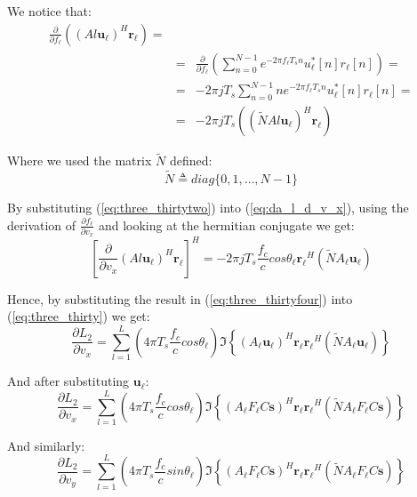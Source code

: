 We notice that:
\begin{eqnarray}
\label{eq:three_thirtytwo}
\frac{\partial}{\partial f_\ell}\left( (Al \mathbf{u_\ell})^H \mathbf{r_\ell}\right) = \\
&=& \frac{\partial}{\partial f_\ell} \left(
\sum_{n=0}^{N-1}e^{-2 \pi f_\ell T_s n}u_\ell^*[n]r_\ell[n]
\right) = \nonumber\\
&=& -2 \pi j T_s \sum_{n=0}^{N-1}ne^{-2 \pi f_\ell T_s n}u_\ell^*[n]r_\ell[n] = 
\nonumber\\
&=& -2 \pi j T_s \left( (\tilde{N} Al \mathbf{u_\ell})^H \mathbf{r_\ell}\right) \nonumber
\end{eqnarray}

Where we used the matrix $ \tilde{N}$ defined:
\begin{equation}
\tilde{N} \triangleq diag\{0,1,\dots ,N-1\}
\end{equation}

By substituting (\ref{eq:three_thirtytwo}) into (\ref{eq:da_l_d_v_x}), using the derivation of $\frac{\partial f_\ell}{\partial v_x}$ and looking at the hermitian conjugate we get:
\begin{equation}
\label{eq:three_thirtyfour}
\left[\frac{\partial}{\partial v_x} (Al \mathbf{u_\ell})^H \mathbf{r_\ell}\right]^H = -2 \pi j T_s \frac{f_c}{c}cos\theta_\ell\mathbf{r_\ell}^H(\tilde{N} A_\ell \mathbf{u_\ell})
\end{equation}

Hence, by substituting the result in (\ref{eq:three_thirtyfour}) into (\ref{eq:three_thirty}) we get:
\begin{equation}
\label{eq:three_thirtyfive}
\frac{\partial L_2}{\partial v_x} = \sum_{l=1}^L (4 \pi T_s\frac{f_c}{c} cos\theta_\ell) \Im
\left\{
(A_\ell \mathbf{u_\ell})^H \mathbf{r_\ell}\mathbf{r_\ell}^H (\tilde{N}A_\ell\mathbf{u_\ell})
\right\}
\end{equation}

And after substituting $\mathbf{u_\ell}$:
\begin{equation}
\label{eq:d_l_2_d_v_x_final}
\frac{\partial L_2}{\partial v_x} = \sum_{l=1}^L (4 \pi T_s\frac{f_c}{c} cos\theta_\ell) \Im
\left\{
(A_\ell F_\ell C \mathbf{s})^H \mathbf{r_\ell}\mathbf{r_\ell}^H (\tilde{N}A_\ell F_\ell C \mathbf{s})
\right\}
\end{equation}

And similarly:
\begin{equation}
\label{eq:d_l_2_d_v_y_final}
\frac{\partial L_2}{\partial v_y} = \sum_{l=1}^L (4 \pi T_s\frac{f_c}{c} sin\theta_\ell) \Im
\left\{
(A_\ell F_\ell C \mathbf{s})^H \mathbf{r_\ell}\mathbf{r_\ell}^H (\tilde{N}A_\ell F_\ell C \mathbf{s})
\right\}
\end{equation}

